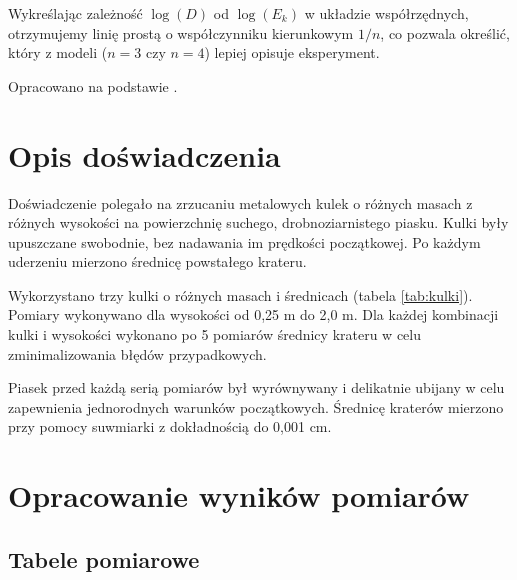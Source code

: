 \documentclass[a4paper,12pt]{article}
\begin{document}
Wykreślając zależność $\log(D)$ od $\log(E_k)$ w układzie współrzędnych, otrzymujemy linię prostą o współczynniku kierunkowym $1/n$, co pozwala określić, który z modeli ($n=3$ czy $n=4$) lepiej opisuje eksperyment.

Opracowano na podstawie \cite{lab12manual}.






\section{Opis doświadczenia}

Doświadczenie polegało na zrzucaniu metalowych kulek o różnych masach z różnych wysokości na powierzchnię suchego, drobnoziarnistego piasku. Kulki były upuszczane swobodnie, bez nadawania im prędkości początkowej. Po każdym uderzeniu mierzono średnicę powstałego krateru.

Wykorzystano trzy kulki o różnych masach i średnicach (tabela \ref{tab:kulki}). Pomiary wykonywano dla wysokości od 0,25 m do 2,0 m. Dla każdej kombinacji kulki i wysokości wykonano po 5 pomiarów średnicy krateru w celu zminimalizowania błędów przypadkowych.

Piasek przed każdą serią pomiarów był wyrównywany i delikatnie ubijany w celu zapewnienia jednorodnych warunków początkowych. Średnicę kraterów mierzono przy pomocy suwmiarki z dokładnością do 0,001 cm.



\section{Opracowanie wyników pomiarów}

\subsection{Tabele pomiarowe}
\end{document}
